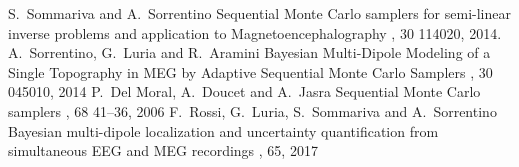 \documentclass[12pt]{article}
\begin{document}
\begin{thebibliography}{1}	
	S.~Sommariva and A.~Sorrentino 
	\newblock Sequential Monte Carlo samplers for semi-linear inverse problems and application to Magnetoencephalography 
	, 30 114020, 2014.
	A.~Sorrentino, G.~Luria and R.~Aramini  
	\newblock Bayesian Multi-Dipole Modeling of a Single Topography in MEG by Adaptive Sequential Monte Carlo Samplers 
	, 30 045010, 2014
	P.~Del Moral, A.~Doucet and A.~Jasra  
	\newblock Sequential Monte Carlo samplers 
	, 68 41--36, 2006
	F.~Rossi, G.~Luria, S.~Sommariva and A.~Sorrentino   
	\newblock Bayesian multi-dipole localization and uncertainty quantification from simultaneous EEG and MEG recordings 
	, 65, 2017 
\end{thebibliography}
\end{document}
